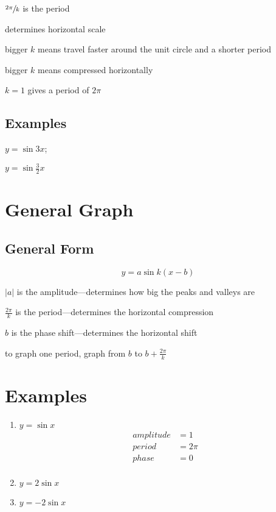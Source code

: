 \documentclass{exam}
\begin{document}
  \begin{itemize*}
    \item $\sfrac{2 \pi}{k}$ is the period
    \item determines horizontal scale
    \item bigger $k$ means travel faster around the unit circle and a shorter period
    \item bigger $k$ means compressed horizontally
    \item $k = 1$ gives a period of $2 \pi$
  \end{itemize*}

  \subsection{Examples}
  \begin{enumerate*}
    \item $y = \sin 3x$; 
    \item $y = \sin \frac{3}{2} x$
  \end{enumerate*}

  \section{General Graph}
  \subsection{General Form}
  \[
    y = a \sin k(x - b)
  \]

  \begin{itemize*}
    \item $|a|$ is the amplitude---determines how big the peaks and valleys are
    \item $\frac{2 \pi}{k}$ is the period---determines the horizontal compression
    \item $b$ is the phase shift---determines the horizontal shift
    \item to graph one period, graph from $b$ to $b + \frac{2 \pi}{k}$
  \end{itemize*}

  \section{Examples}

  \begin{enumerate}
    \item $y = \sin x$
      \begin{align*}
        amplitude & = 1 \\
        period    & = 2 \pi \\
        phase     & = 0 \\
      \end{align*}

    \item $y = 2 \sin x$
    \item $y = - 2 \sin x$
  \end{enumerate}
\end{document}
